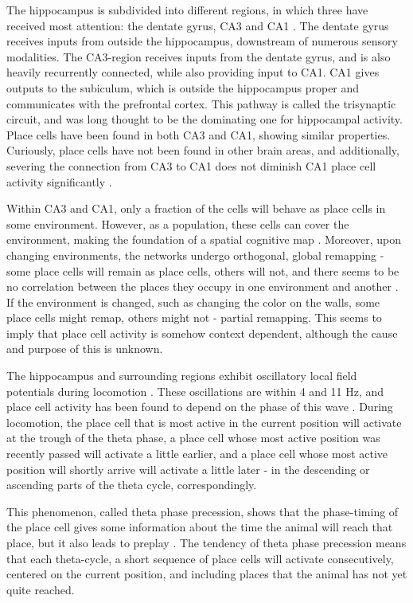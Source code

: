 \documentclass{article}
\begin{document}
    The hippocampus is subdivided into different regions, in which three have received most attention: the dentate gyrus, CA3 and CA1 \parencite{Cherubini2015}. The dentate gyrus receives inputs from outside the hippocampus, downstream of numerous sensory modalities. The CA3-region receives inputs from the dentate gyrus, and is also heavily recurrently connected, while also providing input to CA1. CA1 gives outputs to the subiculum, which is outside the hippocampus proper and communicates with the prefrontal cortex. This pathway is called the trisynaptic circuit, and was long thought to be the dominating one for hippocampal activity. Place cells have been found in both CA3 and CA1, showing similar properties. Curiously, place cells have not been found in other brain areas, and additionally, severing the connection from CA3 to CA1 does not diminish CA1 place cell activity significantly \parencite{Brun2002}.

    Within CA3 and CA1, only a fraction of the cells will behave as place cells in some environment. However, as a population, these cells can cover the environment, making the foundation of a spatial cognitive map \parencite{Wilson1993}. Moreover, upon changing environments, the networks undergo orthogonal, global remapping - some place cells will remain as place cells, others will not, and there seems to be no correlation between the places they occupy in one environment and another \parencite{Muller1987}. If the environment is changed, such as changing the color on the walls, some place cells might remap, others might not - partial remapping. This seems to imply that place cell activity is somehow context dependent, although the cause and purpose of this is unknown.

    The hippocampus and surrounding regions exhibit oscillatory local field potentials during locomotion \parencite{Winson1978}. These oscillations are within 4 and 11 Hz, and place cell activity has been found to depend on the phase of this wave \parencite{OKeefe1993,Skaggs1996, Hafting2008}. During locomotion, the place cell that is most active in the current position will activate at the trough of the theta phase, a place cell whose most active position was recently passed will activate a little earlier, and a place cell whose most active position will shortly arrive will activate a little later - in the descending or ascending parts of the theta cycle, correspondingly.

    This phenomenon, called theta phase precession, shows that the phase-timing of the place cell gives some information about the time the animal will reach that place, but it also leads to preplay \parencite{Dragoi2011,Dragoi2013}. The tendency of theta phase precession means that each theta-cycle, a short sequence of place cells will activate consecutively, centered on the current position, and including places that the animal has not yet quite reached.
\end{document}
